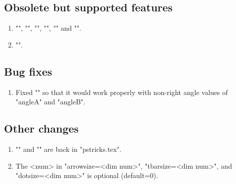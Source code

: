 \subsection{Obsolete but supported features}

  \begin{enumerate}

  \item "\lput", "\mput", "\aput", "\Aput", "\bput" and "\Bput".

  \item "\ncline".

  \end{enumerate}
\subsection{Bug fixes}

  \begin{enumerate}

    \item Fixed "\ncangle" so that it would work properly with non-right angle
values of "angleA" and "angleB".

  \end{enumerate}


\subsection{Other changes}

  \begin{enumerate}

     \item "\OldPsput" and "\NewPsput" are back in "pstricks.tex".

     \item The <num> in "arrowsize=<dim num>", "tbarsize=<dim num>", and
"dotsize=<dim num>" is optional (default=0).

  \end{enumerate}



